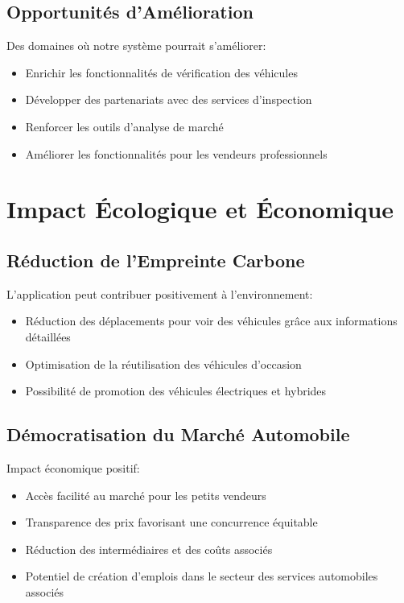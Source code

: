 \subsection{Opportunités d'Amélioration}
Des domaines où notre système pourrait s'améliorer:
\begin{itemize}
    \item Enrichir les fonctionnalités de vérification des véhicules
    \item Développer des partenariats avec des services d'inspection
    \item Renforcer les outils d'analyse de marché
    \item Améliorer les fonctionnalités pour les vendeurs professionnels
\end{itemize}

\section{Impact Écologique et Économique}

\subsection{Réduction de l'Empreinte Carbone}
L'application peut contribuer positivement à l'environnement:
\begin{itemize}
    \item Réduction des déplacements pour voir des véhicules grâce aux informations détaillées
    \item Optimisation de la réutilisation des véhicules d'occasion
    \item Possibilité de promotion des véhicules électriques et hybrides
\end{itemize}

\subsection{Démocratisation du Marché Automobile}
Impact économique positif:
\begin{itemize}
    \item Accès facilité au marché pour les petits vendeurs
    \item Transparence des prix favorisant une concurrence équitable
    \item Réduction des intermédiaires et des coûts associés
    \item Potentiel de création d'emplois dans le secteur des services automobiles associés
\end{itemize} 